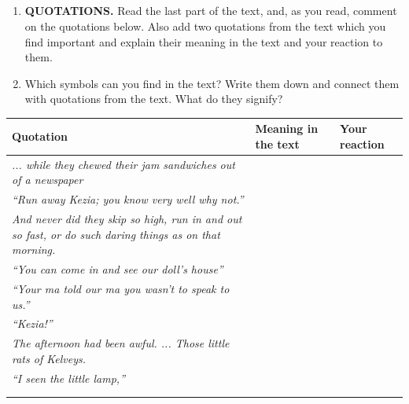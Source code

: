 \documentclass[10pt,a4paper,table]{article}
\begin{document}

\clearpage
\subsection{}

\begin{enumerate}[label=\arabic*.,left=20pt,itemsep=0.8em]
  \item \textbf{QUOTATIONS.} Read the last part of the text, and, as you read, comment on the quotations below. Also add two quotations from the text which you find important and explain their meaning in the text and your reaction to them.
  \item Which symbols can you find in the text? Write them down and connect them with quotations from the text. What do they signify?
\end{enumerate}

\vspace{0.2cm}

{\small
\renewcommand{\arraystretch}{1.7}
\setlength{\tabcolsep}{3pt}
\noindent\begin{tabularx}{0.94\textwidth}{|>{\raggedright\arraybackslash}p{}|>{\raggedright\arraybackslash}X|>{\raggedright\arraybackslash}X|}
  \hline
  \textbf{Quotation} & \textbf{Meaning in the text} & \textbf{Your reaction} \\
  \hline
  \textit{... while they chewed their jam sandwiches out of a newspaper} & & \\
  \hline
  \textit{``Run away Kezia; you know very well why not.''} & & \\
  \hline
  \textit{And never did they skip so high, run in and out so fast, or do such daring things as on that morning.} & & \\
  \hline
  \textit{``You can come in and see our doll's house''} & & \\
  \hline
  \textit{``Your ma told our ma you wasn't to speak to us.''} & & \\
  \hline
  \textit{``Kezia!''} & & \\
  \hline
  \textit{The afternoon had been awful. ... Those little rats of Kelveys.} & & \\
  \hline
  \textit{``I seen the little lamp,''} & & \\
  \hline
  \rule{0pt}{1.2cm} & & \\
  \hline
  \rule{0pt}{1.2cm} & & \\
  \hline
\end{tabularx}
}
\end{document}
